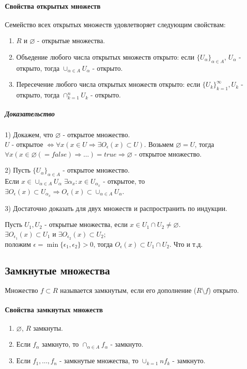 \documentclass[10pt]{article}
\newcommand{\seq}[2]{ \{#1_{#2}\}_{#2=1}^\infty}
\begin{document}
			\paragraph{Свойства открытых множеств}
			Семейство всех открытых множеств удовлетворяет следующим свойствам:
			\begin{enumerate}
				\item $R$ и $\varnothing$ - открытые множества.
				\item Объедение любого числа открытых множеств открыто: если $\{U_\alpha\}_{\alpha \in A}$, $U_\alpha$ - открыто, тогда $\cup_{\alpha \in A} U_\alpha$ - открыто.
				\item Пересечение любого числа открытых множеств открыто: если $\seq{U}{k}, U_k$ - открыто, тогда $\cap_{k=1}^n U_k$ - открыто.
			\end{enumerate}
			
			\subparagraph{Доказательство}
			1) Докажем, что $\varnothing$ - открытое множество. \\
			$U$ - открытое $\Leftrightarrow \forall x (x \in U \Rightarrow \exists O_\epsilon(x) \subset U)$. Возьмем $\varnothing = U$, тогда $\forall x (x \in \varnothing (= false) \Rightarrow \dots) = true \Rightarrow \varnothing$ - открытое множество.
			
			2) Пусть $\{U_\alpha\}_{\alpha \in A}$ - открытое множество.\\
			Если $x \in \cup_{\alpha \in A} U_\alpha$ $\exists \alpha_x : x \in U_{\alpha_x}$ - открытое, то
			$\exists O_\epsilon(x) \subset U_{\alpha_x} \Rightarrow O_\epsilon(x) \subset \cup_{\alpha \in A} U_\alpha$.
			
			3) Достаточно доказать для двух множеств и распространить по индукции.
			
			Пусть $U_1, U_2$ - открытые множества, если $x \in U_1 \cap U_2 \neq \varnothing$.\\
			$\exists O_{\epsilon_1}(x) \subset U_1$ и $\exists O_{\epsilon_2}(x) \subset U_2$; \\
			положим  $\epsilon = \min\{\epsilon_1, \epsilon_2\} > 0$, тогда $O_\epsilon(x) \subset U_1 \cap U_2$. Что и т.д.
		\subsection{Замкнутые множества}
			Множество $f \subset R$ называется замкнутым, если его дополнение ($R\setminus f$) открыто.
			
			\paragraph{Свойства замкнутых множеств}
				\begin{enumerate}
					\item $\varnothing$, $R$ замкнуты.
					\item Если $f_\alpha$ замкнуто, то $\cap_{\alpha \in A} f_\alpha$ - замкнуто.
					\item Если $f_1, \dots, f_n$ - замкнутые множества, то $\cup_{k=1}{n} f_k$ - замкнуто. 
				\end{enumerate}
			
\end{document}
